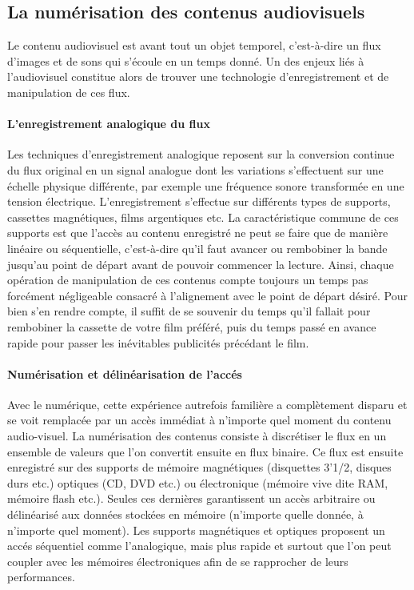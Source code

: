 \subsection{La numérisation des contenus audiovisuels}\label{sec:num}
Le contenu audiovisuel est avant tout un objet temporel, c'est-à-dire un flux d'images et de sons qui s'écoule en un temps donné. 
Un des enjeux liés à l'audiovisuel constitue alors de trouver une technologie d'enregistrement et de manipulation de ces flux.

\paragraph{L'enregistrement analogique du flux}
Les techniques d'enregistrement analogique reposent sur la conversion continue du flux original en un signal analogue dont les variations s'effectuent sur une échelle physique différente, par exemple une fréquence sonore transformée en une tension électrique. 
L'enregistrement s'effectue sur différents types de supports, cassettes magnétiques, films argentiques etc. 
La caractéristique commune de ces supports est que l'accès au contenu enregistré ne peut se faire que de manière linéaire ou séquentielle, c'est-à-dire qu'il faut avancer ou rembobiner la bande jusqu'au point de départ avant de pouvoir commencer la lecture. 
Ainsi, chaque opération de manipulation de ces contenus compte toujours un temps pas forcément négligeable consacré à l'alignement avec le point de départ désiré. 
Pour bien s'en rendre compte, il suffit de se souvenir du temps qu'il fallait pour rembobiner la cassette de votre film préféré, puis du temps passé en avance rapide pour passer les inévitables publicités précédant le film.

\paragraph{Numérisation et délinéarisation de l'accés}
Avec le numérique, cette expérience autrefois familière a complètement disparu et se voit remplacée par un accès immédiat à n'importe quel moment du contenu audio-visuel. 
La numérisation des contenus consiste à discrétiser le flux en un ensemble de valeurs que l'on convertit ensuite en flux binaire. Ce flux est ensuite enregistré sur des supports de mémoire magnétiques (disquettes 3'1/2, disques durs etc.) optiques (CD, DVD etc.) ou électronique (mémoire vive dite RAM, mémoire flash etc.). 
Seules ces dernières garantissent un accès arbitraire ou délinéarisé aux données stockées en mémoire (n'importe quelle donnée, à n'importe quel moment). 
Les supports magnétiques et optiques proposent un accés séquentiel comme l'analogique, mais plus rapide et surtout que l'on peut coupler avec les mémoires électroniques afin de se rapprocher de leurs performances.


